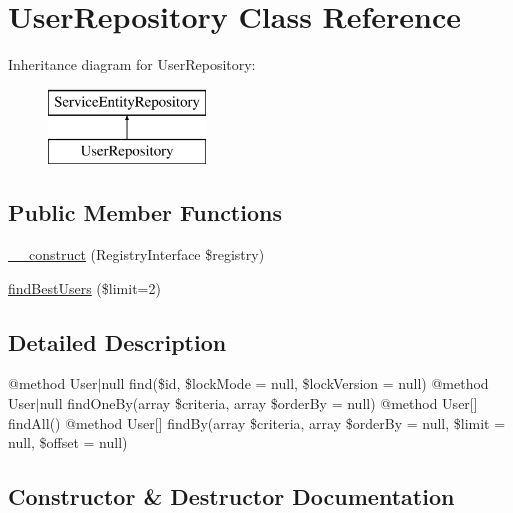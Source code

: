 \hypertarget{class_app_1_1_repository_1_1_user_repository}{}\section{User\+Repository Class Reference}
\label{class_app_1_1_repository_1_1_user_repository}
Inheritance diagram for User\+Repository\+:\begin{figure}[H]
\begin{center}
\leavevmode
\includegraphics[height=2.000000cm]{class_app_1_1_repository_1_1_user_repository}
\end{center}
\end{figure}
\subsection*{Public Member Functions}
\begin{DoxyCompactItemize}
\item 
\mbox{\hyperlink{class_app_1_1_repository_1_1_user_repository_aadca7edd263e228921a1860bb6b9c252}{\+\_\+\+\_\+construct}} (Registry\+Interface \$registry)
\item 
\mbox{\hyperlink{class_app_1_1_repository_1_1_user_repository_a9c9ef88d4f15cf36b3dcc8299dd25461}{find\+Best\+Users}} (\$limit=2)
\end{DoxyCompactItemize}


\subsection{Detailed Description}
@method User$\vert$null find(\$id, \$lock\+Mode = null, \$lock\+Version = null) @method User$\vert$null find\+One\+By(array \$criteria, array \$order\+By = null) @method User\mbox{[}\mbox{]} find\+All() @method User\mbox{[}\mbox{]} find\+By(array \$criteria, array \$order\+By = null, \$limit = null, \$offset = null) 

\subsection{Constructor \& Destructor Documentation}
\mbox{\label{class_app_1_1_repository_1_1_user_repository_aadca7edd263e228921a1860bb6b9c252}} 
